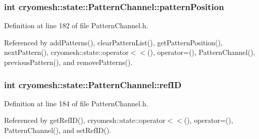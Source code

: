 \hypertarget{classcryomesh_1_1state_1_1PatternChannel_af4a9ce80cd65ae8a11ec27e4b027a34c}{
\subsubsection[{pattern\-Position}]{\setlength{\rightskip}{0pt plus 5cm}int {\bf cryomesh\-::state\-::\-Pattern\-Channel\-::pattern\-Position}}}\label{classcryomesh_1_1state_1_1PatternChannel_af4a9ce80cd65ae8a11ec27e4b027a34c}


\-Definition at line 182 of file \-Pattern\-Channel.\-h.



\-Referenced by add\-Patterns(), clear\-Pattern\-List(), get\-Pattern\-Position(), next\-Pattern(), cryomesh\-::state\-::operator$<$$<$(), operator=(), \-Pattern\-Channel(), previous\-Pattern(), and remove\-Patterns().

\hypertarget{classcryomesh_1_1state_1_1PatternChannel_a609d1d8ac76ff856bf7885c040dc339a}{
\subsubsection[{ref\-I\-D}]{\setlength{\rightskip}{0pt plus 5cm}int {\bf cryomesh\-::state\-::\-Pattern\-Channel\-::ref\-I\-D}}}\label{classcryomesh_1_1state_1_1PatternChannel_a609d1d8ac76ff856bf7885c040dc339a}


\-Definition at line 184 of file \-Pattern\-Channel.\-h.



\-Referenced by get\-Ref\-I\-D(), cryomesh\-::state\-::operator$<$$<$(), operator=(), \-Pattern\-Channel(), and set\-Ref\-I\-D().

